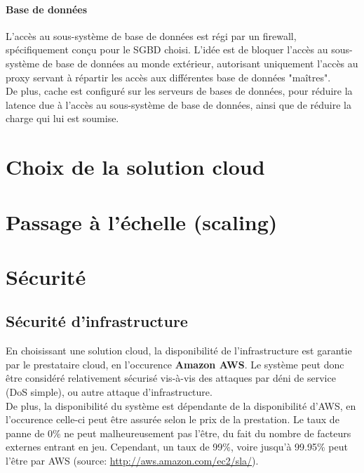 \paragraph{Base de données}

L'accès au sous-système de base de données est régi par un firewall,
spécifiquement conçu pour le SGBD choisi. L'idée est de bloquer l'accès au
sous-système de base de données au monde extérieur, autorisant uniquement
l'accès au proxy servant à répartir les accès aux différentes base de données
"maîtres". \\

De plus, cache est configuré sur les serveurs de bases de données, pour réduire
la latence due à l'accès au sous-système de base de données, ainsi que de
réduire la charge qui lui est soumise.

\section{Choix de la solution cloud}
\label{sec:choix-solution-cloud}
\section{Passage à l'échelle (scaling)}
\label{sec:scaling}

\section{Sécurité}
\label{sec:securite}

\subsection{Sécurité d'infrastructure}
\label{subsec:securite-infrastructure}

En choisissant une solution cloud, la disponibilité de l'infrastructure est
garantie par le prestataire cloud, en l'occurence \textbf{Amazon AWS}. Le
système peut donc être considéré relativement sécurisé vis-à-vis des attaques
par déni de service (DoS simple), ou autre attaque d'infrastructure. \\

De plus, la disponibilité du système est dépendante de la disponibilité d'AWS,
en l'occurence celle-ci peut être assurée selon le prix de la prestation. Le
taux de panne de 0\% ne peut malheureusement pas l'être, du fait du nombre de
facteurs externes entrant en jeu. Cependant, un taux de 99\%, voire jusqu'à
99.95\% peut l'être par AWS (source: \url{http://aws.amazon.com/ec2/sla/}). \\

